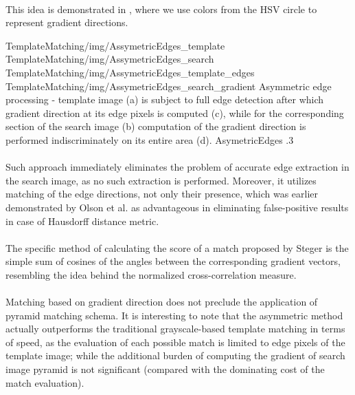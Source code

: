\paragraph*{}
This idea is demonstrated in , where we use colors from the HSV circle to represent gradient directions.

\fourFigures
{TemplateMatching/img/AssymetricEdges_template}
{TemplateMatching/img/AssymetricEdges_search}
{TemplateMatching/img/AssymetricEdges_template_edges}
{TemplateMatching/img/AssymetricEdges_search_gradient}
{Asymmetric edge processing - template image (a) is subject to full edge detection after which gradient direction at its edge pixels is computed (c), while for the corresponding section of the search image (b) computation of the gradient direction is performed indiscriminately on its entire area (d).}
{AsymetricEdges}
{.3\textwidth}

\paragraph*{}
Such approach immediately eliminates the problem of accurate edge extraction in the search image, as no such extraction is performed. Moreover, it utilizes matching of the edge directions, not only their presence, which was earlier demonstrated\cite{Olson97} by Olson et al. as advantageous in eliminating false-positive results in case of Hausdorff distance metric.

\paragraph*{}
The specific method of calculating the score of a match proposed by Steger is the simple sum of cosines of the angles between the corresponding gradient vectors, resembling the idea behind the normalized cross-correlation measure.

\paragraph*{}
Matching based on gradient direction does not preclude the application of pyramid matching schema. It is interesting to note that the asymmetric method actually outperforms the traditional grayscale-based template matching in terms of speed, as the evaluation of each possible match is limited to edge pixels of the template image; while the additional burden of computing the gradient of search image pyramid is not significant (compared with the dominating cost of the match evaluation).

